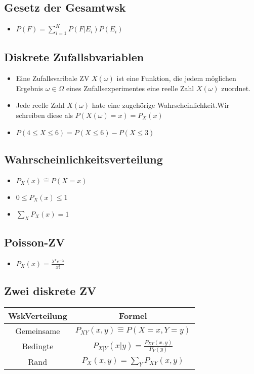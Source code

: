 \documentclass{article}
\begin{document}
\subsection{Gesetz der Gesamtwsk}
\begin{itemize}
\item $P(F) = \sum_{i=1}^K P(F|E_i)P(E_i)$
\end{itemize}



\subsection{Diskrete Zufallsbvariablen}

\begin{itemize}
\item Eine Zufallsvaribale ZV $X(\omega)$ ist eine Funktion, die jedem möglichen \newline Ergebnis $\omega \in \Omega$ eines Zufallsexperimentes eine reelle Zahl $X(\omega)$ zuordnet.
\item Jede reelle Zahl $X(\omega)$ hate eine zugehörige Wahrscheinlichkeit.\newline Wir schreiben diese als $P(X(\omega) = x) = P_X(x)$
\item $P(4\leq X \leq 6) = P(X\leq 6) -P(X \leq 3)$
\end{itemize}

\subsection{Wahrscheinlichkeitsverteilung}
\begin{itemize}
\item $P_X(x) \hat{=} P(X=x)$
\item $ 0 \leq P_X(x) \leq 1$
\item $\sum_X P_X(x) = 1$
\end{itemize}

\subsection{Poisson-ZV}
\begin{itemize}
\item $P_X(x) = \frac{\lambda^x e^{-\lambda}}{x!}$
\end{itemize}


\subsection{Zwei diskrete ZV}
\begin{tabular}{c | c}
WskVerteilung & Formel \\ \hline
Gemeinsame & $P_{XY}(x,y) \hat{=} P(X=x,Y=y)$\\
Bedingte& $P_{X|Y}(x|y) = \frac{P_{XY}(x,y)}{P_Y(y)}$\\
Rand & $P_X(x,y) = \sum_Y P_{XY}(x,y)$\\

\end{tabular}
\end{document}
